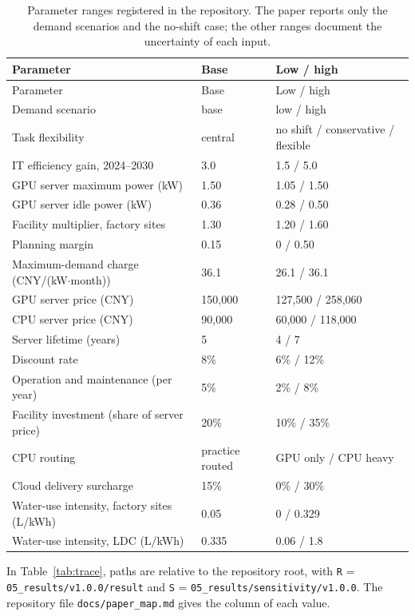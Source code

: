 \documentclass[11pt]{article}
\begin{document}
{\small
\begin{longtable}{@{}L{0.42\textwidth}L{0.20\textwidth}L{0.32\textwidth}@{}}
\caption{Parameter ranges registered in the repository. The paper reports only the demand scenarios and the no-shift case; the other ranges document the uncertainty of each input.}\label{tab:ranges}\\
\toprule
Parameter & Base & Low / high \\
\midrule
\endfirsthead
\toprule
Parameter & Base & Low / high \\
\midrule
\endhead
\bottomrule
\endfoot
Demand scenario & base & low / high \\
Task flexibility & central & no shift / conservative / flexible \\
IT efficiency gain, 2024--2030 & 3.0 & 1.5 / 5.0 \\
GPU server maximum power (kW) & 1.50 & 1.05 / 1.50 \\
GPU server idle power (kW) & 0.36 & 0.28 / 0.50 \\
Facility multiplier, factory sites & 1.30 & 1.20 / 1.60 \\
Planning margin & 0.15 & 0 / 0.50 \\
Maximum-demand charge (CNY/(kW$\cdot$month)) & 36.1 & 26.1 / 36.1 \\
GPU server price (CNY) & 150,000 & 127,500 / 258,060 \\
CPU server price (CNY) & 90,000 & 60,000 / 118,000 \\
Server lifetime (years) & 5 & 4 / 7 \\
Discount rate & 8\% & 6\% / 12\% \\
Operation and maintenance (per year) & 5\% & 2\% / 8\% \\
Facility investment (share of server price) & 20\% & 10\% / 35\% \\
CPU routing & practice routed & GPU only / CPU heavy \\
Cloud delivery surcharge & 15\% & 0\% / 30\% \\
Water-use intensity, factory sites (L/kWh) & 0.05 & 0 / 0.329 \\
Water-use intensity, LDC (L/kWh) & 0.335 & 0.06 / 1.8 \\
\end{longtable}}

\noindent In Table~\ref{tab:trace}, paths are relative to the repository root, with \texttt{R} = \texttt{05\_results/v1.0.0/result} and \texttt{S} = \texttt{05\_results/sensitivity/v1.0.0}. The repository file \texttt{docs/paper\_map.md} gives the column of each value.
\end{document}
